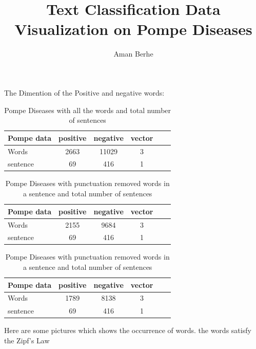 \documentclass{article}
\title{Text Classification }
\title{Data Visualization on Pompe Diseases}
\author{Aman Berhe}
\begin{document}
\maketitle
\newpage
The Dimention of the Positive and negative words: 
\begin{table}[h!]
  \centering
  \caption{Pompe Diseases with all the words and total number of sentences }
  \label{tab:table1}
  \begin{tabular}{l|c c c c|r}
      Pompe data  & positive & negative & vector& \\
    \hline
      Words & 2663 & 11029 & 3& \\
    \hline
      sentence & 69 & 416 & 1& \\
  \end{tabular}
\end{table}
\begin{table}[h!]
  \centering
  \caption{Pompe Diseases with punctuation removed words in a sentence and total number of sentences }
  \label{tab:table1}
  \begin{tabular}{l|c c c c|r}
      Pompe data  & positive & negative & vector& \\
    \hline
      Words & 2155 & 9684  & 3& \\
    \hline
      sentence & 69 & 416 & 1& \\
  \end{tabular}
\end{table}
\begin{table}[h!]
  \centering
  \caption{Pompe Diseases with punctuation removed words in a sentence and total number of sentences }
  \label{tab:table1}
  \begin{tabular}{l|c c c c|r}
      Pompe data  & positive & negative & vector& \\
    \hline
      Words & 1789 & 8138  & 3& \\
    \hline
      sentence & 69 & 416 & 1& \\
  \end{tabular}
\end{table}
\newpage
Here are some pictures which shows the occurrence of words. the words satisfy the Zipf's Law\\
\end{document}

